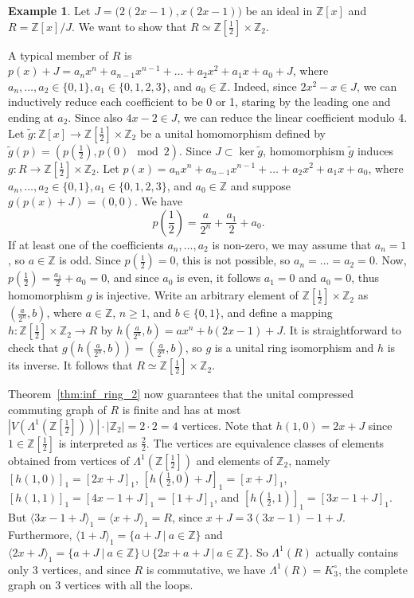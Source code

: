 \documentclass[12pt,a4paper]{amsart}
\theoremstyle{definition}
\newtheorem{example}[proposition]{Example}
\newcommand{\Z}{\mathbb{Z}}
\newcommand{\rng}[1]{\langle #1 \rangle}
\begin{document}
\begin{example} \label{ex:directproduct}
Let $J = \big(2(2x-1), x(2x-1)\big)$ be an ideal in $\Z[x]$ and $R = \Z[x]/J$. We want to show that $R \simeq \Z[\frac12] \times \Z_2$.

A typical member of $R$ is $p(x) + J = a_nx^n + a_{n-1}x^{n-1} + \ldots + a_2x^2 + a_1x + a_0 + J$, where $a_n, \ldots, a_2 \in \{0,1\}, a_1 \in \{0,1,2,3\}$, and $a_0 \in \Z$. 
Indeed, since $2x^2 -x \in J$, we can inductively reduce each coefficient to be 0 or 1, staring by the leading one and ending at $a_2$. Since also $4x -2 \in J$, we can reduce the linear coefficient modulo 4.  Let $\tilde{g}\colon \Z[x] \to \Z[\frac12] \times \Z_2$ be a unital homomorphism defined by $\tilde{g}(p) = (p(\frac12), p(0) \mod 2)$. 
Since $J \subset \mathop{\mathrm{ker}} \tilde{g}$, homomorphism $\tilde{g}$ induces $g\colon R \to \Z[\frac12] \times \Z_2$.
Let $p(x) = a_nx^n + a_{n-1}x^{n-1} + \ldots + a_2x^2 + a_1x + a_0$, where $a_n, \ldots, a_2 \in \{0,1\}, a_1 \in \{0,1,2,3\}$, and $a_0 \in \Z$ and suppose $g(p(x)+J) = (0,0)$. We have 
$$p\left(\frac12\right) = \frac{a}{2^n} + \frac{a_1}{2} + a_0.$$ 
If at least one of the coefficients $a_n, \ldots, a_2$ is non-zero, we may assume that $a_n=1$, so $a\in \Z$ is odd. Since $p(\frac12) = 0$, this is not possible, so $a_n= \ldots =a_2=0$.
Now, $p(\frac12) = \frac{a_1}{2} + a_0 =0$, and since $a_0$ is even, it follows $a_1 =0$ and $a_0=0$, thus homomorphism $g$ is injective.
Write an arbitrary element of $\Z[\frac12] \times \Z_2$ as $(\frac{a}{2^n}, b)$, where $a \in \Z$, $n \ge 1$, and $b \in \{0,1\}$, and define a mapping $h\colon \Z[\frac12] \times \Z_2 \to R$ by $h(\frac{a}{2^n}, b) = ax^n + b(2x-1) +J$.
It is straightforward to check that $g(h(\frac{a}{2^n}, b)) = (\frac{a}{2^n}, b)$, so $g$ is a unital ring isomorphism and $h$ is its inverse.
It follows that $R \simeq \Z[\frac12] \times \Z_2$.

Theorem~\ref{thm:inf_ring_2} now guarantees that the unital compressed commuting graph of $R$ is finite and has at most $|V(\Lambda^1(\Z[\frac12]))| \cdot |\Z_2| = 2 \cdot 2 = 4$ vertices. 
Note that $h(1,0) = 2x+J$ since $1 \in \Z[\frac12]$ is interpreted as $\frac22$. 
The vertices are equivalence classes of elements obtained from vertices of  $\Lambda^1(\Z[\frac12])$ and elements of $\Z_2$, namely $[h(1, 0)]_1 = [2x + J]_1$, $[h(\frac12, 0) + J]_1 = [x + J]_1$, $[h(1, 1)]_1 = [4x - 1 + J]_1 = [1 + J]_1$, and $[h(\frac12, 1)]_1 = [3x -1 + J]_1$. But  $\rng{3x - 1 + J}_1 = \rng{x + J}_1 = R$, since $x + J = 3(3x-1) - 1 + J$. Furthermore, $\rng{1 + J}_1 = \{a+J ~|~ a \in \Z\}$ and $\rng{2x + J}_1 =  \{a+J ~|~ a \in \Z\} \cup  \{2x + a+J ~|~ a \in \Z\}$.  So $\Lambda^1(R)$ actually contains only 3 vertices, and since $R$ is commutative, we have $\Lambda^1(R) = K^\circ_3$, the complete graph on 3 vertices with all the loops. 
\end{example}
\end{document}
